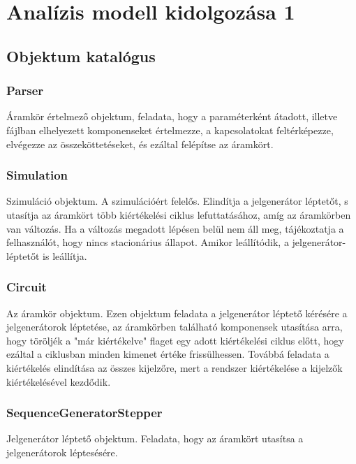 %
\chapter{Analízis modell kidolgozása 1}

\thispagestyle{fancy}

\section{Objektum katalógus}

\subsection{\bf Parser}
Áramkör értelmező objektum, feladata, hogy a paraméterként átadott, illetve fájlban elhelyezett komponenseket értelmezze, a kapcsolatokat feltérképezze, elvégezze az összeköttetéseket, és ezáltal felépítse az áramkört.

\subsection{\bf Simulation}
Szimuláció objektum. A szimulációért felelős. Elindítja a jelgenerátor léptetőt, s utasítja az áramkört több kiértékelési ciklus lefuttatásához, amíg az áramkörben van változás. Ha a változás megadott lépésen belül nem áll meg, tájékoztatja a felhasználót, hogy nincs stacionárius állapot. Amikor leállítódik, a jelgenerátor-léptetőt is leállítja.

\subsection{\bf Circuit}
Az áramkör objektum. Ezen objektum feladata a jelgenerátor léptető kérésére a jelgenerátorok léptetése, az áramkörben található komponensek utasítása arra, hogy töröljék a "már kiértékelve" flaget egy adott kiértékelési ciklus előtt, hogy ezáltal a ciklusban minden kimenet értéke frissülhessen.
Továbbá feladata a kiértékelés elindítása az összes kijelzőre, mert a rendszer kiértékelése a kijelzők kiértékelésével kezdődik.

\subsection{\bf SequenceGeneratorStepper}
Jelgenerátor léptető objektum. Feladata, hogy az áramkört utasítsa a jelgenerátorok léptesésére.

